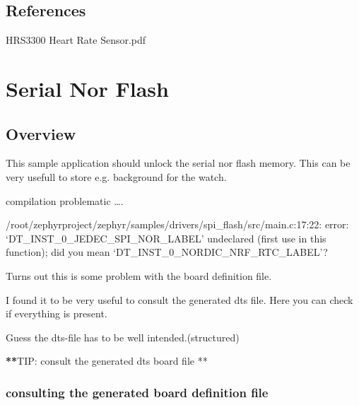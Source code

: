 \documentclass[letterpaper,10pt,english]{sphinxmanual}
\begin{document}
\subsection{References}
\label{\detokenize{drivers/hrs3300:references}}
HRS3300 Heart Rate Sensor.pdf


\section{Serial Nor Flash}
\label{\detokenize{drivers/spinor:serial-nor-flash}}\label{\detokenize{drivers/spinor::doc}}
\begin{sphinxVerbatim}[commandchars=\\\{\}]
\end{sphinxVerbatim}


\subsection{Overview}
\label{\detokenize{drivers/spinor:overview}}
This sample application should unlock the serial nor flash memory.
This can be very usefull to store e.g. background for the watch.

compilation problematic ….

/root/zephyrproject/zephyr/samples/drivers/spi\_flash/src/main.c:17:22: error: ‘DT\_INST\_0\_JEDEC\_SPI\_NOR\_LABEL’ undeclared (first use in this function); did you mean ‘DT\_INST\_0\_NORDIC\_NRF\_RTC\_LABEL’?

Turns out this is some problem with the board definition file.

I found it to be very useful to consult the generated dts file.
Here you can check if everything is present.

Guess the dts-file has to be well intended.(structured)

{\color{red}\bfseries{}**}TIP: consult the generated dts board file **


\subsubsection{consulting the generated board definition file}
\label{\detokenize{drivers/spinor:consulting-the-generated-board-definition-file}}
\begin{sphinxVerbatim}[commandchars=\\\{\}]
\end{sphinxVerbatim}
\end{document}
